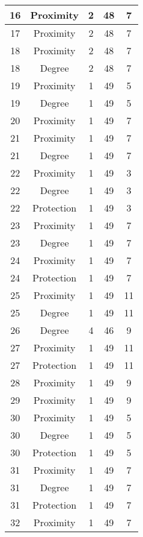 \documentclass[results.tex]{subfiles}
\begin{document}
\begin{center}
\begin{tabular}{| c || c | c | c | c |}
    \hline
    16 & Proximity & 2 & 48 & 7 \\ 
    \hline
    17 & Proximity & 2 & 48 & 7 \\ 
    \hline
    18 & Proximity & 2 & 48 & 7 \\ 
    \hline
    18 & Degree & 2 & 48 & 7 \\ 
    \hline
    19 & Proximity & 1 & 49 & 5 \\ 
    \hline
    19 & Degree & 1 & 49 & 5 \\ 
    \hline
    20 & Proximity & 1 & 49 & 7 \\ 
    \hline
    21 & Proximity & 1 & 49 & 7 \\ 
    \hline
    21 & Degree & 1 & 49 & 7 \\ 
    \hline
    22 & Proximity & 1 & 49 & 3 \\ 
    \hline
    22 & Degree & 1 & 49 & 3 \\ 
    \hline
    22 & Protection & 1 & 49 & 3 \\ 
    \hline
    23 & Proximity & 1 & 49 & 7 \\ 
    \hline
    23 & Degree & 1 & 49 & 7 \\ 
    \hline
    24 & Proximity & 1 & 49 & 7 \\ 
    \hline
    24 & Protection & 1 & 49 & 7 \\ 
    \hline
    25 & Proximity & 1 & 49 & 11 \\ 
    \hline
    25 & Degree & 1 & 49 & 11 \\ 
    \hline
    26 & Degree & 4 & 46 & 9 \\ 
    \hline
    27 & Proximity & 1 & 49 & 11 \\ 
    \hline
    27 & Protection & 1 & 49 & 11 \\ 
    \hline
    28 & Proximity & 1 & 49 & 9 \\ 
    \hline
    29 & Proximity & 1 & 49 & 9 \\ 
    \hline
    30 & Proximity & 1 & 49 & 5 \\ 
    \hline
    30 & Degree & 1 & 49 & 5 \\ 
    \hline
    30 & Protection & 1 & 49 & 5 \\ 
    \hline
    31 & Proximity & 1 & 49 & 7 \\ 
    \hline
    31 & Degree & 1 & 49 & 7 \\ 
    \hline
    31 & Protection & 1 & 49 & 7 \\ 
    \hline
    32 & Proximity & 1 & 49 & 7 \\ 
    \hline

\end{tabular}
\end{center}
\end{document}
